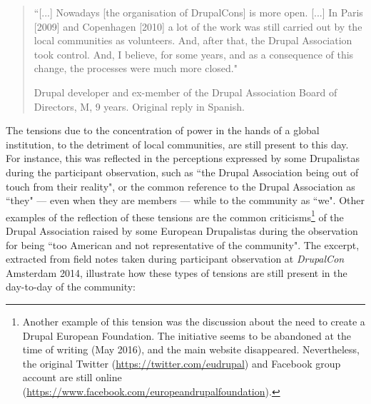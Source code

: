 \begin{quotation}
``[...] Nowadays [the organisation of DrupalCons] is more open. [...] In Paris [2009] and Copenhagen [2010] a lot of the work was still carried out by the local communities as volunteers. And, after that, the Drupal Association took control. And, I believe, for some years, and as a consequence of this change, the processes were much more closed."

\begin{flushright}\footnotesize{Drupal developer and ex-member of the Drupal Association Board of Directors, M, 9 years. Original reply in Spanish.}\end{flushright}
\end{quotation}

The tensions due to the concentration of power in the hands of a global institution, to the detriment of local communities, are still present to this day. For instance, this was reflected in the perceptions expressed by some Drupalistas during the participant observation, such as ``the Drupal Association being out of touch from their reality", or the common reference to the Drupal Association as ``they" --- even when they are members --- while to the community as ``we". Other examples of the reflection of these tensions are the common criticisms\footnote{Another example of this tension was the discussion about the need to create a Drupal European Foundation. The initiative seems to be abandoned at the time of writing (May 2016), and the main website disappeared. Nevertheless, the original Twitter (\url{https://twitter.com/eudrupal}) and Facebook group account are still online (\url{https://www.facebook.com/europeandrupalfoundation}).} of the Drupal Association raised by some European Drupalistas during the observation for being ``too American and not representative of the community". The excerpt, extracted from field notes taken during participant observation at \textit{DrupalCon} Amsterdam 2014, illustrate how these types of tensions are still present in the day-to-day of the community:


